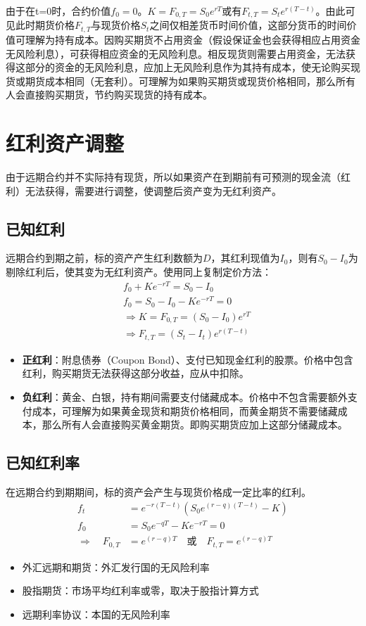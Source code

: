 \documentclass[11pt]{article}
\begin{document}
由于在t=0时，合约价值$f_0=0$。$K=F_{0,T}=S_0e^{rT}$或有$F_{t,T}=S_te^{r(T-t)}$。由此可见此时期货价格$F_{t,T}$与现货价格$S_t$之间仅相差货币时间价值，这部分货币的时间价值可理解为持有成本。因购买期货不占用资金（假设保证金也会获得相应占用资金无风险利息），可获得相应资金的无风险利息。相反现货则需要占用资金，无法获得这部分的资金的无风险利息，应加上无风险利息作为其持有成本，使无论购买现货或期货成本相同（无套利）。可理解为如果购买期货或现货价格相同，那么所有人会直接购买期货，节约购买现货的持有成本。

\section{红利资产调整}
由于远期合约并不实际持有现货，所以如果资产在到期前有可预测的现金流（红利）无法获得，需要进行调整，使调整后资产变为无红利资产。

\subsection{已知红利}
远期合约到期之前，标的资产产生红利数额为$D$，其红利现值为$I_0$，则有$S_0-I_0$为剔除红利后，使其变为无红利资产。使用同上复制定价方法：
\begin{align*}
    &f_0 + Ke^{-rT} = S_0 - I_0 \\
    &f_0 = S_0 - I_0 - Ke^{-rT} = 0 \\ 
    &\Rightarrow K = F_{0,T} = (S_0 - I_0)e^{rT} \\
    &\Rightarrow F_{t,T} = (S_t - I_t)e^{r(T-t)}
\end{align*}
\begin{itemize}
    \item \textbf{正红利}：附息债券（Coupon Bond）、支付已知现金红利的股票。价格中包含红利，购买期货无法获得这部分收益，应从中扣除。
    \item \textbf{负红利}：黄金、白银，持有期间需要支付储藏成本。价格中不包含需要额外支付成本，可理解为如果黄金现货和期货价格相同，而黄金期货不需要储藏成本，那么所有人会直接购买黄金期货。即购买期货应加上这部分储藏成本。
\end{itemize}

\subsection{已知红利率}
在远期合约到期期间，标的资产会产生与现货价格成一定比率的红利。
\begin{align*}
    f_t &= e^{-r(T-t)} (S_0 e^{(r-q)(T-t)} - K) \\ 
    f_0 &= S_0 e^{-qT} - K e^{-rT} = 0 \\ 
    \Rightarrow \quad F_{0,T} &= e^{(r-q)T} \quad \text{或} \quad F_{t,T} = e^{(r-q)T}
\end{align*}
\begin{itemize}
    \item 外汇远期和期货：外汇发行国的无风险利率
    \item 股指期货：市场平均红利率或零，取决于股指计算方式
    \item 远期利率协议：本国的无风险利率
\end{itemize}
\end{document}
